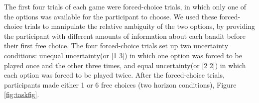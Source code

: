 \documentclass[12pt]{article}
\begin{document}
	The first four trials of each game were forced-choice trials, in which only one of the options was available for the participant to choose. We used these forced-choice trials to manipulate the relative ambiguity of the two options, by providing the participant with different amounts of information about each bandit before their first free choice. The four forced-choice trials set up two uncertainty conditions: unequal uncertainty(or [1 3]) in which one option was forced to be played once and the other three times, and equal uncertainty(or [2 2]) in which each option was forced to be played twice. After the forced-choice trials, participants made either 1 or 6 free choices (two horizon conditions),  Figure \ref{fig:taskfig}.
	
	
	
\end{document}
